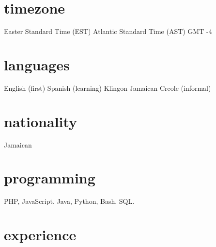 \documentclass[]{friggeri-cv} %
\begin{document}
\begin{aside}
\section{timezone}
Easter Standard Time (EST)
Atlantic Standard Time (AST)
GMT -4
\section{languages}
English (first)
Spanish (learning)
Klingon
Jamaican Creole (informal)
\section{nationality}
Jamaican
\section{programming}
 PHP, JavaScript, Java, Python, Bash, SQL.
\end{aside}


\section{experience}
\end{document}
